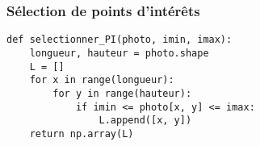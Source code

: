 \subsubsection{Sélection de points d'intérêts}
\begin{Exercise}[title = {\bf I.B.2)}]
\begin{lstlisting}
def selectionner_PI(photo, imin, imax):
    longueur, hauteur = photo.shape
    L = []
    for x in range(longueur):
        for y in range(hauteur):
            if imin <= photo[x, y] <= imax:
                L.append([x, y])
    return np.array(L)
\end{lstlisting}
\end{Exercise}
